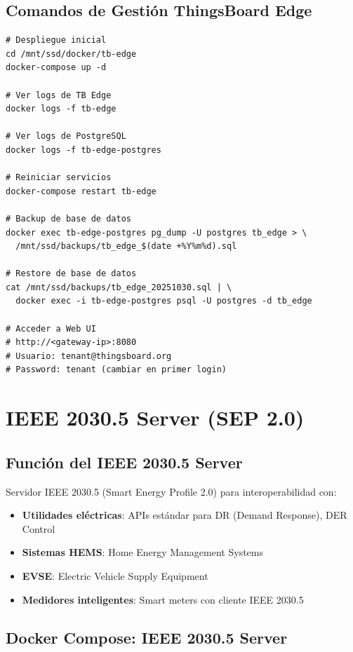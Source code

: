 \subsection{Comandos de Gestión ThingsBoard Edge}

\begin{verbatim}
# Despliegue inicial
cd /mnt/ssd/docker/tb-edge
docker-compose up -d

# Ver logs de TB Edge
docker logs -f tb-edge

# Ver logs de PostgreSQL
docker logs -f tb-edge-postgres

# Reiniciar servicios
docker-compose restart tb-edge

# Backup de base de datos
docker exec tb-edge-postgres pg_dump -U postgres tb_edge > \
  /mnt/ssd/backups/tb_edge_$(date +%Y%m%d).sql

# Restore de base de datos
cat /mnt/ssd/backups/tb_edge_20251030.sql | \
  docker exec -i tb-edge-postgres psql -U postgres -d tb_edge

# Acceder a Web UI
# http://<gateway-ip>:8080
# Usuario: tenant@thingsboard.org
# Password: tenant (cambiar en primer login)
\end{verbatim}

\section{IEEE 2030.5 Server (SEP 2.0)}

\subsection{Función del IEEE 2030.5 Server}

Servidor IEEE 2030.5 (Smart Energy Profile 2.0) para interoperabilidad con:

\begin{itemize}
    \item \textbf{Utilidades eléctricas}: APIs estándar para DR (Demand Response), DER Control
    \item \textbf{Sistemas HEMS}: Home Energy Management Systems
    \item \textbf{EVSE}: Electric Vehicle Supply Equipment
    \item \textbf{Medidores inteligentes}: Smart meters con cliente IEEE 2030.5
\end{itemize}

\subsection{Docker Compose: IEEE 2030.5 Server}

